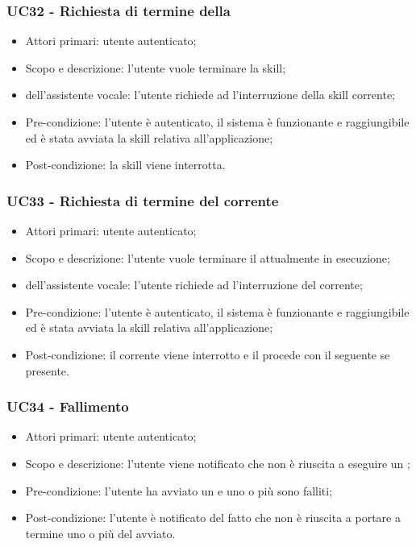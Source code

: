 \subsubsection{UC32 - Richiesta di termine della }
\begin{itemize}
	\item Attori primari: utente autenticato;
	\item Scopo e descrizione: l'utente vuole terminare la skill;
	\item {} dell'assistente vocale: l'utente richiede ad   l'interruzione della skill corrente;
	\item Pre-condizione: l'utente è autenticato, il sistema è funzionante e raggiungibile ed è stata avviata la skill relativa all'applicazione;
	\item Post-condizione: la skill viene interrotta.
\end{itemize}
\subsubsection{UC33 - Richiesta di termine del  corrente}
\begin{itemize}
	\item Attori primari: utente autenticato;
	\item Scopo e descrizione: l'utente vuole terminare il  attualmente in esecuzione;
	\item {} dell'assistente vocale: l'utente richiede ad   l'interruzione del  corrente;
	\item Pre-condizione: l'utente è autenticato, il sistema è funzionante e raggiungibile ed è stata avviata la skill relativa all'applicazione;
	\item Post-condizione: il  corrente viene interrotto e il  procede con il  seguente se presente.
\end{itemize}
\subsubsection{UC34 - Fallimento }
\begin{itemize}
	\item  Attori primari: utente autenticato;
	\item  Scopo e descrizione: l'utente viene notificato che   non è riuscita a eseguire un ;
	\item  Pre-condizione: l'utente ha avviato un  e uno o più  sono falliti;
	\item  Post-condizione: l'utente è notificato del fatto che   non è riuscita a portare a termine uno o più  del  avviato.
\end{itemize}